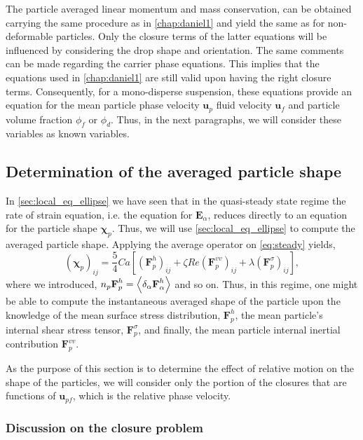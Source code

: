 The particle averaged linear momentum and mass conservation, can be obtained carrying the same procedure as in \ref{chap:daniel1} and yield the same as for non-deformable particles. 
Only the closure terms of the latter equations will be influenced by considering the drop shape and orientation.
The same comments can be made regarding the carrier phase equations. 
This implies that the equations used in \ref{chap:daniel1} are still valid upon having the right closure terms. 
Consequently, for a mono-disperse suspension, these equations provide an equation for the mean particle phase velocity $\textbf{u}_p$ fluid velocity $\textbf{u}_f$ and particle volume fraction $\phi_f$ or $\phi_d$. 
Thus, in the next paragraphs, we will consider these variables as known variables. 

\subsection{Determination of the averaged particle shape}

In \ref{sec:local_eq_ellipse} we have seen that in the quasi-steady state regime the rate of strain equation, i.e. the equation for $\textbf{E}_\alpha$, reduces directly to an equation for the particle shape $\bm\chi_p$. 
Thus, we will use \ref{sec:local_eq_ellipse} to compute the averaged particle shape. 
Applying the average operator on \ref{eq:steady} yields,
\begin{equation}
    (\bm\chi_{p})_{ij}
    = 
    \frac{5}{4}Ca \left[
        (\textbf{F}_p^h )_{ij}
        + \zeta Re (\textbf{F}_p^{vv})_{ij}
        +    \lambda (\textbf{F}_p^{\sigma})_{ij}
    \right],
    \label{eq:steady_state_avg}
\end{equation}
where we introduced, $n_p \textbf{F}_p^h = \left<\delta_\alpha \textbf{F}_\alpha^h\right>$ and so on. 
Thus, in this regime, one might be able to compute the instantaneous averaged shape of the particle upon the knowledge of the mean surface stress distribution, $\textbf{F}_p^h$, the mean particle's internal shear stress tensor, $\textbf{F}_p^{\sigma}$, and finally, the mean particle internal inertial contribution $\textbf{F}_p^{vv}$. 

As the purpose of this section is to determine the effect of relative motion on the shape of the particles, we will consider only the portion of the closures that are functions of $\textbf{u}_{pf}$, which is the relative phase velocity. 

\subsubsection{Discussion on the closure problem}   

